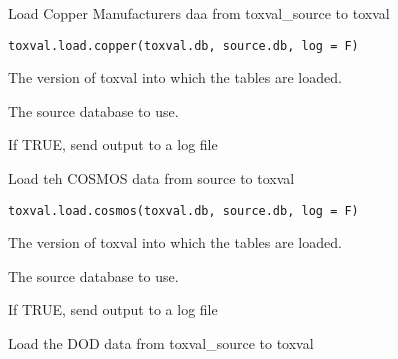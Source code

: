 \documentclass[letterpaper]{book}
\begin{document}
%
\begin{Description}\relax
Load Copper Manufacturers daa from toxval\_source to toxval
\end{Description}
%
\begin{Usage}
\begin{verbatim}
toxval.load.copper(toxval.db, source.db, log = F)
\end{verbatim}
\end{Usage}
%
\begin{Arguments}
\begin{ldescription}
\item[\code{toxval.db}] The version of toxval into which the tables are loaded.

\item[\code{source.db}] The source database to use.

\item[\code{log}] If TRUE, send output to a log file
\end{ldescription}
\end{Arguments}
%
\begin{Description}\relax
Load teh COSMOS data from source to toxval
\end{Description}
%
\begin{Usage}
\begin{verbatim}
toxval.load.cosmos(toxval.db, source.db, log = F)
\end{verbatim}
\end{Usage}
%
\begin{Arguments}
\begin{ldescription}
\item[\code{toxval.db}] The version of toxval into which the tables are loaded.

\item[\code{source.db}] The source database to use.

\item[\code{log}] If TRUE, send output to a log file
\end{ldescription}
\end{Arguments}
%
\begin{Description}\relax
Load the DOD data from toxval\_source to toxval
\end{Description}
\end{document}

